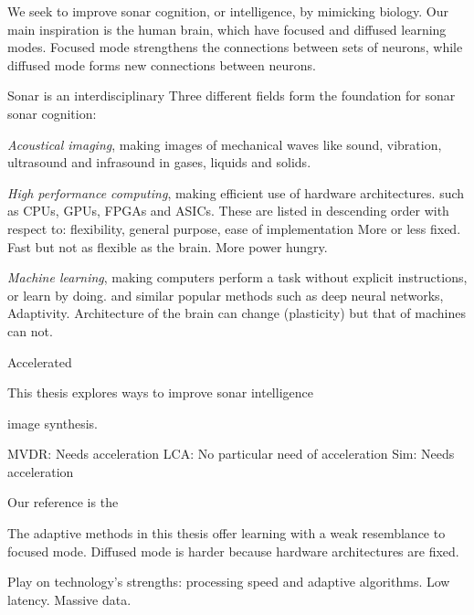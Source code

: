 
We seek to improve sonar cognition, or intelligence, by mimicking biology. Our main inspiration is the human brain, which have focused and diffused learning modes. Focused mode strengthens the connections between sets of neurons, while diffused mode forms new connections between neurons. 


Sonar  is an interdisciplinary 
Three different fields form the foundation for sonar sonar cognition:

\emph{Acoustical imaging}, making images of mechanical waves like sound, vibration, ultrasound and infrasound in gases, liquids and solids.

\emph{High performance computing}, making efficient use of hardware architectures.  such as CPUs, GPUs, FPGAs and ASICs. These are listed in descending order with respect to: flexibility, general purpose, ease of implementation  More or less fixed. Fast but not as flexible as the brain. More power hungry. 

\emph{Machine learning}, making computers perform a task without explicit instructions, or learn by doing. and similar popular methods such as deep neural networks, Adaptivity. Architecture of the brain can change (plasticity) but that of machines can not. 


Accelerated 

This thesis explores ways to improve sonar intelligence 

image synthesis.

MVDR: Needs acceleration
LCA: No particular need of acceleration
Sim: Needs acceleration




 Our reference is the 


The adaptive methods in this thesis offer learning with a weak resemblance to focused mode. Diffused mode is harder because hardware architectures are fixed. 


Play on technology's strengths: processing speed and adaptive algorithms. Low latency. Massive data. 

% 
%

%
%
%
%
%

